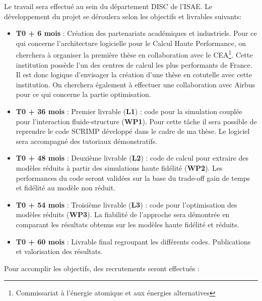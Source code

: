 \documentclass[12pt, french]{article}
\begin{document}
	Le travail sera effectué au sein du département DISC de l'ISAE. Le développement du projet se déroulera selon les objectifs et livrables suivants:
	\begin{itemize}
		\item \textbf{T0 + 6 mois} : Création des partenariats académiques et industriels.
		Pour ce qui concerne l'architecture logicielle pour le Calcul Haute Performance, on cherchera à organiser la première thèse en collaboration avec le CEA\footnote{Commissariat à l'énergie atomique et aux énergies alternatives}. Cette institution possède l'un des centres de calcul les plus performants de France. Il est donc logique d'envisager la création d'une thèse en cotutelle avec cette institution. On cherchera également à effectuer une collaboration avec Airbus pour ce qui concerne la partie optimisation.
		\item \textbf{T0 + 36 mois} : Premier livrable (\textbf{L1}) : code pour la simulation couplée pour l'interaction fluide-structure (\textbf{WP1}). Pour cette t\^ache il sera possible de reprendre le code SCRIMP développé dans le cadre de ma thèse. Le logiciel sera accompagné des tutoriaux démonstratifs.
		\item \textbf{T0 + 48 mois} : Deuxième livrable (\textbf{L2}) : code de calcul pour extraire des modèles réduits à partir des simulations haute fidélité (\textbf{WP2}). \newline Les performances du code seront validées sur la base du trade-off gain de temps et fidélité au modèle non réduit.
		\item \textbf{T0 + 54 mois} : Troisième livrable (\textbf{L3}) : code pour l'optimisation des modèles réduits (\textbf{WP3}). La fiabilité de l'approche sera démontrée en comparant les résultats obtenus sur les modèles haute fidélité et réduits. 
		\item \textbf{T0 + 60 mois} : Livrable final regroupant les différents codes. 		Publications et valorisation des résultats. 
	\end{itemize} 
\vspace{5pt}
Pour accomplir les objectifs, des recrutements seront effectués :
\end{document}
